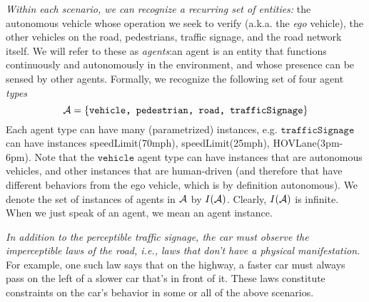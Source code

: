 {\it Within each scenario, we can recognize a recurring set of entities: }
the autonomous vehicle whose operation we seek to verify (a.k.a. the \emph{ego} vehicle), the other vehicles on the road, pedestrians, traffic signage, and the road network itself. 
We will refer to these as \emph{agents}:an agent is an entity that functions continuously and autonomously in the environment, and whose presence can be sensed by other agents. 
Formally, we recognize the following set of four agent \emph{types}
\[\mathcal{A} = \{\texttt{vehicle, pedestrian, road, trafficSignage}\}\]
Each agent type can have many (parametrized) instances, e.g. $\texttt{trafficSignage}$ can have instances speedLimit(70mph), speedLimit(25mph), HOVLane(3pm-6pm).
Note that the $\texttt{vehicle}$ agent type can have instances that are autonomous vehicles, and other instances that are human-driven (and therefore that have different behaviors from the ego vehicle, which is by definition autonomous). 
We denote the set of instances of agents in $\mathcal{A}$ by $I(\mathcal{A})$.
Clearly, $I(\mathcal{A})$ is infinite.
When we just speak of an agent, we mean an agent instance.

{\it In addition to the perceptible traffic signage, the car must observe the imperceptible laws of the road, i.e., laws that don't have a physical manifestation. }
For example, one such law says that on the highway, a faster car must always pass on the left of a slower car that's in front of it.
These laws constitute constraints on the car's behavior in some or all of the above scenarios.

